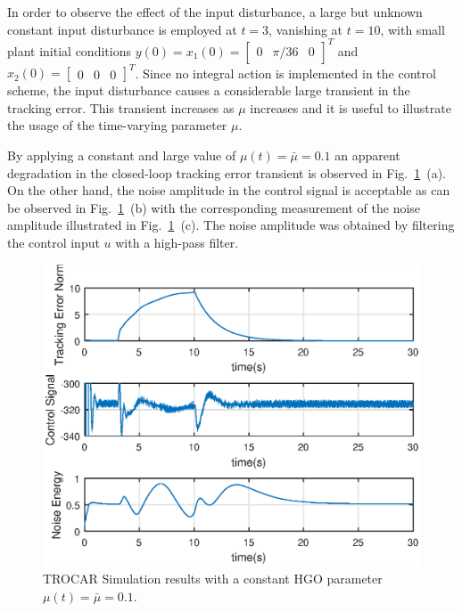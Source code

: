 \documentclass[letterpaper, 10 pt, conference]{ieeeconf}  %
\theoremstyle{plain}
\theoremstyle{definition}
\theoremstyle{remark}
\begin{document}
In order to observe the effect of the input disturbance, a large but unknown constant input disturbance is employed at $t=3$, vanishing at $t=10$, with small plant initial conditions  $y(0)=x_1(0)=\left[\begin{array}{ccc} 0  & \pi/36 & 0\end{array} \right ]^T$ and $x_2(0)=\left[\begin{array}{ccc} 0  & 0 & 0\end{array} \right ]^T$. Since no integral action is implemented in the control scheme, the input disturbance causes a considerable large transient in the tracking error. This transient increases as $\mu$ increases and it is useful to illustrate the usage of the time-varying parameter $\mu$.


By applying a constant and large value of $\mu(t)=\bar{\mu}\!=\!0.1$ an apparent degradation in the closed-loop tracking error transient is observed in Fig.~\ref{fig:timevarying1}~(a). On the other hand, the noise amplitude in the control signal is acceptable as can be observed in Fig.~\ref{fig:timevarying1}~(b) with the corresponding measurement of the noise amplitude illustrated in Fig.~\ref{fig:timevarying1}~(c). The noise amplitude was obtained by filtering the control input $u$ with a high-pass filter. 
%
\begin{figure}[h!]
\begin{center}
\includegraphics[width = 13cm]{Figs/mu0dot1-30sec.eps}
\caption{TROCAR Simulation results with a constant HGO parameter $\mu(t)=\bar{\mu}\!=\!0.1$.}
\label{fig:timevarying1}
\end{center}
\end{figure}
\end{document}
